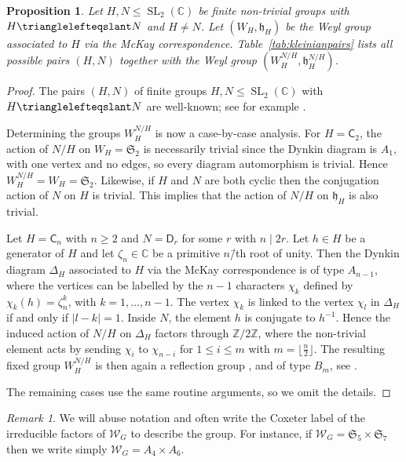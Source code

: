 \documentclass[a4paper]{amsart}
\theoremstyle{plain}
\newtheorem{proposition}[theorem]{Proposition}
\theoremstyle{definition}
\theoremstyle{remark}
\newtheorem{remark}[theorem]{Remark}
\DeclareMathOperator{\SL}{SL}
\newcommand{\CC}{\mathbb C}
\newcommand{\ZZ}{\mathbb Z}
\begin{document}
\begin{proposition}
  \label{prop:SL2pairs}
  Let \(H, N\leqslant\SL_2(\CC)\) be finite non-trivial groups with \(H\trianglelefteqslant N\) and \(H\neq N\).
  Let \((W_H, \mathfrak h_H)\) be the Weyl group associated to \(H\) via the McKay correspondence.
  Table~\ref{tab:kleinianpairs} lists all possible pairs \((H, N)\) together with the Weyl group \((W_H^{N/H}, \mathfrak h_H^{N/H})\).
\end{proposition}
\begin{proof}
  The pairs \((H, N)\) of finite groups \(H, N\leqslant\SL_2(\CC)\) with \(H\trianglelefteqslant N\) are well-known; see for example \cite[p.~56]{Val64}.

  Determining the groups \(W_H^{N/H}\) is now a case-by-case analysis.
  For \(H = \mathsf C_2\), the action of $N/H$ on $W_H = \mathfrak{S}_2$ is necessarily trivial since the Dynkin diagram is $A_1$, with one vertex and no edges, so every diagram automorphism is trivial. Hence $W_H^{N/H} = W_H = \mathfrak{S}_2$. Likewise, if \(H\) and \(N\) are both cyclic then the conjugation action of $N$ on $H$ is trivial.  This implies that the action of \(N/H\) on \(\mathfrak h_H\) is also trivial.

  Let \(H = \mathsf C_n\) with \(n\geqslant 2\) and \(N = \mathsf D_r\) for some \(r\) with \(n\mid 2r\).
  Let \(h\in H\) be a generator of \(H\) and let \(\zeta_n\in \CC\) be a primitive \(n\)\=/th root of unity.
  Then the Dynkin diagram \(\Delta_H\) associated to \(H\) via the McKay correspondence is of type \(A_{n - 1}\), where the vertices can be labelled by the \(n - 1\) characters \(\chi_k\) defined by \(\chi_k(h) = \zeta_n^k\), with \(k = 1,\dots, n - 1\).
  The vertex \(\chi_k\) is linked to the vertex \(\chi_l\) in \(\Delta_H\) if and only if \(|{l - k}| = 1\).
  Inside \(N\), the element \(h\) is conjugate to \(h^{-1}\).
  Hence the induced action of \(N/H\) on \(\Delta_H\) factors through \(\ZZ/2\ZZ\), where the non-trivial element acts by sending \(\chi_i\) to \(\chi_{n - i}\) for \(1\leqslant i \leqslant m\) with \(m = \lfloor\frac{n}{2}\rfloor\).
  The resulting fixed group \(W_H^{N/H}\) is then again a reflection group \cite[Thm.~32]{Ste68}, \cite{GI14} and of type \(B_m\), see \cite[p.~175, Ex.~(a)]{Ste68}.

  The remaining cases use the same routine arguments, so we omit the details.
\end{proof}

\begin{remark}
	We will abuse notation and often write the Coxeter label of the irreducible factors of $\mathcal{W}_G$ to describe the group. For instance, if $\mathcal{W}_G = \mathfrak{S}_5 \times \mathfrak{S}_7$ then we write simply $\mathcal{W}_G = A_4 \times A_6$. 
\end{remark}
\end{document}
